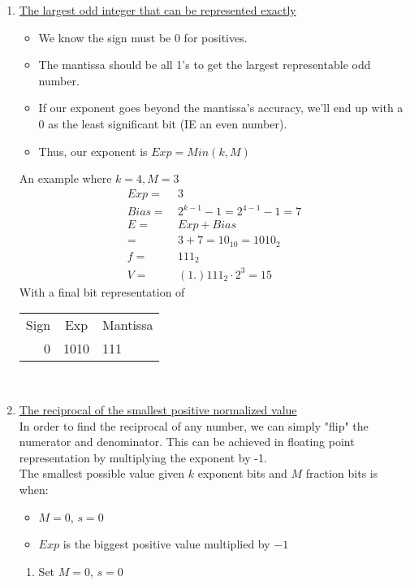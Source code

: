 \documentclass{article}
\begin{document}
\begin{enumerate}[label=\Alph*)]
    \item \underline{The largest odd integer that can be represented exactly}
    \begin{itemize}
        \item We know the sign must be 0 for positives.
        \item The mantissa should be all 1's to get the largest representable odd number.
        \item If our exponent goes beyond the mantissa's accuracy, we'll end up with a 0 as the least significant bit (IE an even number).
        \item Thus, our exponent is \(Exp = Min(k, M)\)
    \end{itemize}
    An example where \(k = 4, M = 3\)
    \begin{align*}
        Exp =&\ 3 \\
        Bias =&\ 2^{k-1} - 1 = 2^{4-1} - 1 = 7 \\
        E =&\ Exp + Bias \\
          =&\ 3 + 7 = 10_{10} = 1010_2 \\
        f =&\ 111_2 \\
        V =&\ (1.)111_2 \cdot 2^{3} = 15
    \end{align*}
    With a final bit representation of
    \begin{tabular}{r|c|l}
        Sign & Exp & Mantissa \\
        0 & 1010 & 111 \\
    \end{tabular} \\
    \pagebreak

    \item \underline{The reciprocal of the smallest positive normalized value} \\ [\baselineskip]
    In order to find the reciprocal of any number, we can simply "flip" the numerator and denominator. This can be achieved in floating point representation by multiplying the exponent by -1. \\
    The smallest possible value given \(k\) exponent bits and \(M\) fraction bits is when:
    \begin{itemize}[label=\(\square\)]
        \item \(M = 0\), \(s = 0\)
        \item \(Exp\) is the biggest positive value multiplied by \(-1\)
    \end{itemize}
    \begin{enumerate}[label=\arabic*.]
        \item Set \(M =0\), \(s = 0\)
    \end{enumerate}
\end{enumerate}
\end{document}
